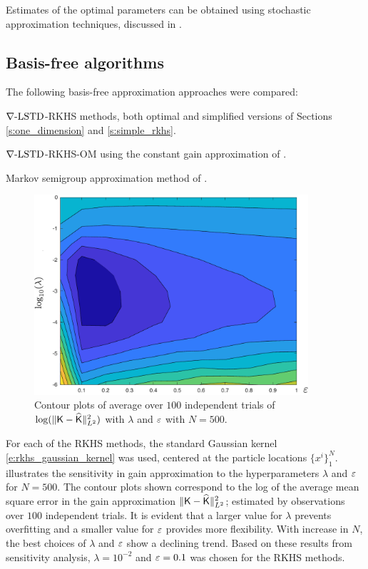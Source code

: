 Estimates of the optimal parameters can be obtained using stochastic approximation techniques, discussed in . 

\subsection*{Basis-free algorithms}
The following basis-free approximation approaches were compared:
\begin{romannum}
\item $\nabla\text{-LSTD}$-RKHS methods, both optimal and simplified versions of Sections \ref{s:one_dimension} and \ref{s:simple_rkhs}.
\item $\nabla\text{-LSTD}$-RKHS-OM using the constant gain approximation of .
\item Markov semigroup approximation method of  \cite{tagmeh16a}.
\end{romannum}
\begin{figure}[htbp]
	\centering
	\includegraphics[width = 4in]{images/Chap4_log_mse_contour_2m}
	\caption{Contour plots of average over $100$ independent trials of $\log(\|\text{\sf K} - \widehat{\text{\sf K}}\|^2_{L^2})$ with $\lambda$ and $\varepsilon$ with $N=500$.}
	\label{fig:log_mse_contour}
\end{figure}
 For each of the RKHS methods, the standard Gaussian kernel \eqref{e:rkhs_gaussian_kernel} was used, centered at the particle locations $\{x^i\}_1^N$.  illustrates the sensitivity in gain approximation to the hyperparameters $\lambda$ and $\varepsilon$ for $N=500$. The contour plots shown correspond to the log of the average mean square error in the gain approximation $\|\text{\sf K} - \widehat{\text{\sf K}} \|^2_{L^2}$; estimated by observations over $100$ independent trials. It is evident that a larger value for $\lambda$ prevents overfitting and a smaller value for $\varepsilon$ provides more flexibility. With increase in $N$, the best choices of $\lambda$ and $\varepsilon$ show a declining trend. Based on these results from sensitivity analysis, $\lambda = 10^{-2}$ and $\varepsilon = 0.1$ was chosen for the RKHS methods.

